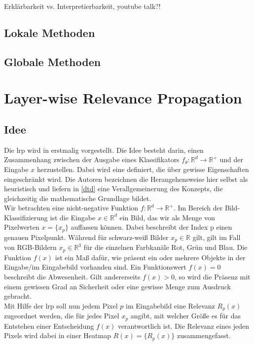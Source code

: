 \documentclass[twoside, 11pt,a4paper]{article}
\numberwithin{equation}{section}
\begin{document}
	Erklärbarkeit vs. Interpretierbarkeit, youtube talk?!
	
	\subsection{Lokale Methoden}
	
	\subsection{Globale Methoden}
	
	\section{Layer-wise Relevance Propagation} \label{chapter_lrp}
	\subsection{Idee}
	
	Die \gls{lrp} wird in \cite{LRP_first_paper} erstmalig vorgestellt. Die Idee besteht darin, einen Zusammenhang zwischen der Ausgabe eines Klassifikators $f_{\theta}: \mathbb{R}^d\to \mathbb{R^{+}}$ und der Eingabe $x$ herzustellen. Dabei wird eine definiert, die über gewisse Eigenschaften eingeschränkt wird. Die Autoren bezeichnen die Herangehensweise hier selbst als heuristisch und liefern in \ref{dtd} eine Verallgemeinerung des Konzepts, die gleichzeitig die mathematische Grundlage bildet.\\
	
	Wir betrachten eine nicht-negative Funktion $f: \mathbb{R}^d \to \mathbb{R}^{+}$. Im Bereich der Bild-Klassifizierung ist die Eingabe $x \in \mathbb{R}^d$ ein Bild, das wir als Menge von Pixelwerten $x=\lbrace x_p \rbrace$ auffassen können. Dabei beschreibt der Index p einen genauen Pixelpunkt. Während für schwarz-weiß Bilder $x_p \in \mathbb{R}$ gilt, gilt im Fall von RGB-Bildern $x_p \in \mathbb{R}^3$ für die einzelnen Farbkanäle Rot, Grün und Blau. Die Funktion $f(x)$ ist ein Maß dafür, wie präsent ein oder mehrere Objekte in der Eingabe/im Eingabebild vorhanden sind. Ein Funktionswert $f(x)=0$ beschreibt die Abwesenheit. Gilt andererseits $f(x) >0$, so wird die Präsenz mit einem gewissen Grad an Sicherheit oder eine gewisse Menge zum Ausdruck gebracht.\\
	
	Mit Hilfe der \gls{lrp} soll nun jedem Pixel $p$ im Eingabebild eine Relevanz $R_p(x)$ zugeordnet werden, die für jedes Pixel $x_p$ angibt, mit welcher Größe es für das Entstehen einer Entscheidung $f(x)$ verantwortlich ist. Die Relevanz eines jeden Pixels wird dabei in einer Heatmap $R(x) = \lbrace R_p(x) \rbrace$ zusammengefasst.
	
\end{document}
